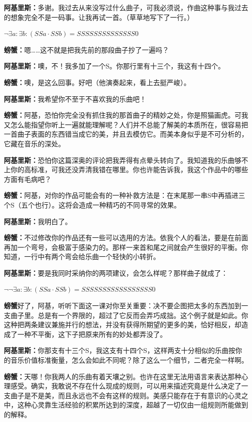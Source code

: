 \documentclass[
  12pt,
  twoside,
  openright,
  oldfontcommands,
]{memoir}
\newcommand{\kaitismall}[1]{{\kaitifamily\small #1}}
\newcommand{\dialogname}[1]{{\heifamily\bfseries #1}}
\begin{document}
\dialogname{阿基里斯：}多谢。我过去从来没写过什么曲子，可我必须说，作曲这种事与我过去的想象完全不是一码事。让我再试一首。\kaitismall{（草草地写下了一行。）}

$\lnot \exists a:\exists b:(SSa\cdot SSb)=SSSSSSSSSSSSSS0$

\dialogname{螃蟹：}嗯\ldots\ldots 这不就是把我先前的那段曲子抄了一遍吗？

\dialogname{阿基里斯：}噢，不！我多加了一个S。你那行里有十三个，我这有十四个。

\dialogname{螃蟹：}噢，是这么回事。好吧（\kaitismall{他演奏起来，看上去挺严峻}）。

\dialogname{阿基里斯：}我希望你不至于不喜欢我的乐曲吧！

\dialogname{螃蟹：}阿基，恐怕你完全没有抓住我的那首曲子的精妙之处，你是照猫画虎。可我又怎么能指望你听上一遍就能理解呢？人们并不总能了解美的本质所在，很容易把一首曲子表面的东西错当成它的美，并且去模仿它。而美本身似乎是不可分析的，它藏在音乐的深处。

\dialogname{阿基里斯：}恐怕你这篇深奥的评论把我弄得有点晕头转向了。我知道我的乐曲够不上你的高标准，可我还没弄清我错在哪里。你也许能告诉我，我这个作品中的哪些方面有毛病吧？

\dialogname{螃蟹：}阿基，对你的作品可能会有的一种补救方法是：在末尾那一串S中再插进三个S（五个也行）。这将会造成一种精巧的不同寻常的效果。

\dialogname{阿基里斯：}我明白了。

\dialogname{螃蟹：}不过修改你的作品还有一些可以选用的方法。依我个人的看法，要是在前面再加一个弯号，会极富于感染力的。那样一来首和尾之间就会产生很好的平衡。你知道，一行中有两个弯会给乐曲一个轻快的小转折。

\dialogname{阿基里斯：}要是我同时采纳你的两项建议，会怎么样呢？那样曲子就成了：

$\lnot \lnot \exists a:\exists b:(SSa\cdot SSb)=SSSSSSSSSSSSSSSSS0$

\dialogname{螃蟹}好了，阿基，听听下面这一课对你至关重要：决不要企图把太多的东西加到一支曲子里。总是有一个界限的，超过了它反而会弄巧成拙。这个例子就是如此。你这种把两条建议兼施并行的想法，并没有获得所期望的更多的美，恰好相反，却造成了一种不平衡，这下子把原来所有的妙处都弄没了。

\dialogname{阿基里斯：}你那支有十三个S，我这支有十四个S，这样两支十分相似的乐曲按你的音乐价值标准衡量，怎么会如此不同呢？除了这么一个细节，二者完全一样啊。

\dialogname{螃蟹：}天哪！你我两人的乐曲有着天壤之别。也许在这里无法用语言来表达那种心理感受。确实，我敢说不存在什么现成的规则，可以用来描述究竟是什么决定了一支曲子是不是美，而且永远也不会有这样的规则。美感只能存在于有意识的心灵之中，这种心灵靠生活经验的积累所达到的深度，超越了一切仅由一组规则所能做到的解释。
\end{document}
